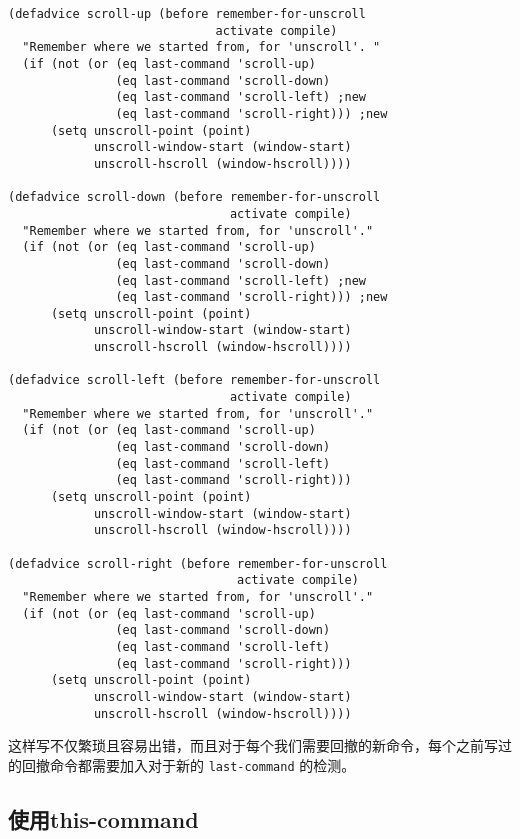 \begin{verbatim}
(defadvice scroll-up (before remember-for-unscroll
                             activate compile)
  "Remember where we started from, for 'unscroll'. "
  (if (not (or (eq last-command 'scroll-up)
               (eq last-command 'scroll-down)
               (eq last-command 'scroll-left) ;new
               (eq last-command 'scroll-right))) ;new
      (setq unscroll-point (point)
            unscroll-window-start (window-start)
            unscroll-hscroll (window-hscroll))))

(defadvice scroll-down (before remember-for-unscroll
                               activate compile)
  "Remember where we started from, for 'unscroll'."
  (if (not (or (eq last-command 'scroll-up)
               (eq last-command 'scroll-down)
               (eq last-command 'scroll-left) ;new
               (eq last-command 'scroll-right))) ;new
      (setq unscroll-point (point)
            unscroll-window-start (window-start)
            unscroll-hscroll (window-hscroll))))

(defadvice scroll-left (before remember-for-unscroll
                               activate compile)
  "Remember where we started from, for 'unscroll'."
  (if (not (or (eq last-command 'scroll-up)
               (eq last-command 'scroll-down)
               (eq last-command 'scroll-left)
               (eq last-command 'scroll-right)))
      (setq unscroll-point (point)
            unscroll-window-start (window-start)
            unscroll-hscroll (window-hscroll))))

(defadvice scroll-right (before remember-for-unscroll
                                activate compile)
  "Remember where we started from, for 'unscroll'."
  (if (not (or (eq last-command 'scroll-up)
               (eq last-command 'scroll-down)
               (eq last-command 'scroll-left)
               (eq last-command 'scroll-right)))
      (setq unscroll-point (point)
            unscroll-window-start (window-start)
            unscroll-hscroll (window-hscroll))))
\end{verbatim}

这样写不仅繁琐且容易出错，而且对于每个我们需要回撤的新命令，每个之前写过的回撤命令都需要加入对于新的 \texttt{last-command} 的检测。

\subsection{使用this-command}
\label{section:03-Using-this-command}

